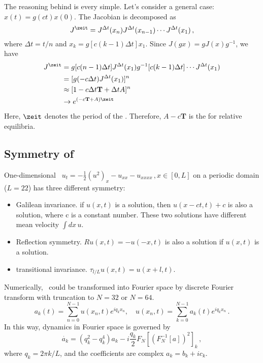 The reasoning behind is every simple. Let's consider a general case:
$x(t)=g(ct)x(0)$. The Jacobian is decomposed as
\[
J^{\zeit} = J^{\Delta t} (x_n) J^{\Delta t} (x_{n-1})\cdots  J^{\Delta t} (x_1)
\,,
\]
where $\Delta t = t/n$ and $x_{k}=g[c(k-1)\Delta t] x_1$. Since
$J(gx)=gJ(x)g^{-1}$, we have
\begin{align*}
J^{\zeit} & = g[c(n-1)\Delta t]J^{\Delta t} (x_1)g^{-1}[c(k-1)\Delta t]
\cdots J^{\Delta t} (x_1) \\
& = [g(-c\Delta t)J^{\Delta t} (x_1)]^{n} \\
& \approx [1 - c\Delta t \mathbf{T} + \Delta t A]^n \\
& \to e^{(-c\mathbf{T}+A)\zeit}
\end{align*}
Here, $\zeit$ denotes the period of the \reqv. Therefore,
$A-c\mathbf{T}$ is the {\stabmat} for relative equilibria.

\subsection{Symmetry of \KSe }
\label{subsect: symkse}

One-dimensional \KSe\  $u_t=-\frac{1}{2}(u^2)_x-u_{xx}-u_{xxxx}\,,x\in [0,L]$ on a
periodic domain ($L=22$) has three different
symmetry:
\begin{itemize}
\item Galilean invariance. if $u(x,t)$ is a solution, then
  $u(x-ct,t)+c$ is also a solution, where c is a constant
  number. These two solutions have different mean velocity
  $\int dx\, u$.
\item Reflection symmetry.  $Ru(x,t)=-u(-x,t)$ is also a solution
  if $u(x,t)$ is a solution.
\item transitional invariance. $\tau_{l/L}u(x,t)=u(x+l,t)$.
\end{itemize}

Numerically, \KSe\
could be transformed into
Fourier space by discrete Fourier transform with truncation
to $N=32$ or $N=64$.
\[
a_{k}(t)=\sum_{n=0}^{N-1}u(x_{n},t)e^{iq_{k}x_{n}},\quad
u(x_{n},t)=\sum_{k=0}^{N-1}a_{k}(t)e^{iq_{k}x_{n}}
\,.
\]
In this way, dynamics in Fourier space is governed by
\[
\dot{a_k}=(q_{k}^2-q_k^4)a_k-i\frac{q_k}{2}F_{N}[(F_N^{-1}[a])^2]_k
\,,
\]
where $q_k = 2\pi k/L$, and the coefficients are complex
$a_{k}=b_{k}+ic_{k}$.


